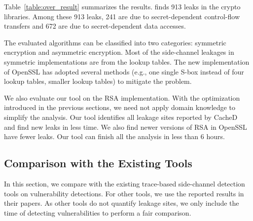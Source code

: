 Table~\ref{table:over_result} summarizes the results.
\detect{} finds 913 leaks in the crypto libraries.
Among these 913 leaks, 241 are due to secret-dependent
control-flow transfers and 672 are due to secret-dependent data accesses.

The evaluated algorithms can be classified into two categories: symmetric
encryption and asymmetric encryption. Most of the side-channel leakages in symmetric implementations are from the lookup tables. The new implementation of OpenSSL has adopted several methods (e.g., one single S-box instead of four lookup tables, smaller lookup tables) to mitigate the problem. 

We also evaluate our tool on the RSA implementation. With the optimization
introduced in the previous sections, we need not apply domain knowledge to
simplify the analysis. Our tool identifies all leakage sites
reported by CacheD~\cite{203878} and find new leaks in less time.
We also find newer versions of RSA in OpenSSL have fewer leaks. Our tool can
finish all the analysis in less than 6 hours. 

\subsection{Comparison with the Existing Tools}
\label{eval:scala}

In this section, we compare \detect{} with the
existing trace-based side-channel detection tools on vulnerability detections. For other tools, we use the reported results in their papers. As other tools do not quantify leakage sites, we only include the time of detecting vulnerabilities to perform a fair comparison.

